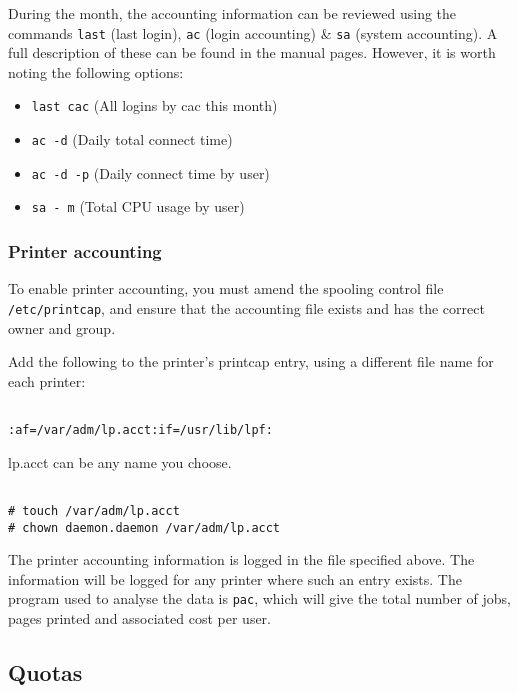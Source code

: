 During the month, the accounting information can be reviewed using the commands
{\tt last} (last login), {\tt ac} (login accounting) \& {\tt sa} (system accounting).
A full description of these can be found in the manual pages. However, it is
worth noting the following options:

\begin{itemize}

\item {\tt last cac} (All logins by cac this month)

\item {\tt ac -d} (Daily total connect time)

\item {\tt ac -d -p} (Daily connect time by user)

\item {\tt sa - m} (Total CPU usage by user)

\end{itemize}

\subsubsection{Printer accounting}

To enable printer accounting, you must amend the spooling control file
{\tt /etc/printcap}, and ensure that the accounting file exists and has the correct
owner and group.

Add the following to the printer's printcap entry, using a different
file name for each printer:

\begin{verbatim}

:af=/var/adm/lp.acct:if=/usr/lib/lpf:

\end{verbatim}

lp.acct can be any name you choose.

\begin{verbatim}

# touch /var/adm/lp.acct
# chown daemon.daemon /var/adm/lp.acct

\end{verbatim}

The printer accounting information is logged in the file specified above.
The information will be logged for any printer where such an entry exists.
The program used to analyse the data is {\tt pac}, which will give the total
number of jobs, pages printed and associated cost per user.

\subsection{Quotas}

